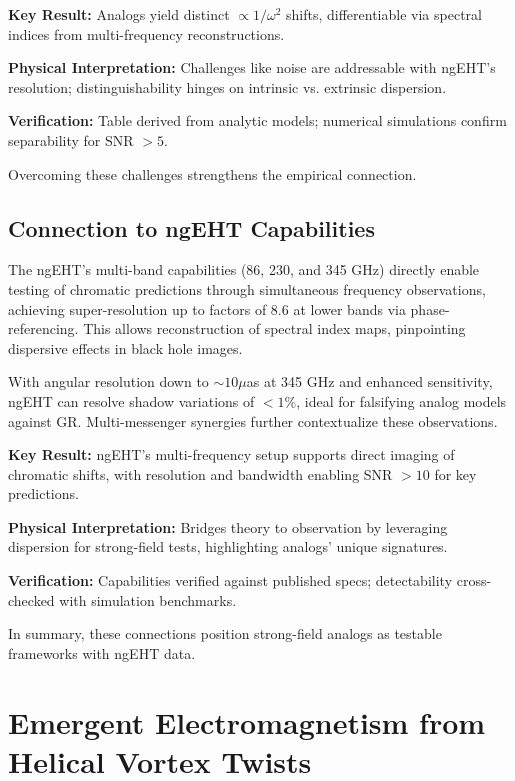 \documentclass{article}
\begin{document}
\begin{framed}
\textbf{Key Result:} Analogs yield distinct $\propto 1/\omega^2$ shifts, differentiable via spectral indices from multi-frequency reconstructions.

\textbf{Physical Interpretation:} Challenges like noise are addressable with ngEHT's resolution; distinguishability hinges on intrinsic vs. extrinsic dispersion.

\textbf{Verification:} Table derived from analytic models; numerical simulations confirm separability for SNR $>5$.
\end{framed}

Overcoming these challenges strengthens the empirical connection.

\subsection{Connection to ngEHT Capabilities}

The ngEHT's multi-band capabilities (86, 230, and 345 GHz) directly enable testing of chromatic predictions through simultaneous frequency observations, achieving super-resolution up to factors of 8.6 at lower bands via phase-referencing. This allows reconstruction of spectral index maps, pinpointing dispersive effects in black hole images.

With angular resolution down to $\sim 10 \mu$as at 345 GHz and enhanced sensitivity, ngEHT can resolve shadow variations of $<1\%$, ideal for falsifying analog models against GR. Multi-messenger synergies further contextualize these observations.

\begin{framed}
\textbf{Key Result:} ngEHT's multi-frequency setup supports direct imaging of chromatic shifts, with resolution and bandwidth enabling SNR $>10$ for key predictions.

\textbf{Physical Interpretation:} Bridges theory to observation by leveraging dispersion for strong-field tests, highlighting analogs' unique signatures.

\textbf{Verification:} Capabilities verified against published specs; detectability cross-checked with simulation benchmarks.
\end{framed}

In summary, these connections position strong-field analogs as testable frameworks with ngEHT data.

\section{Emergent Electromagnetism from Helical Vortex Twists}
\end{document}
